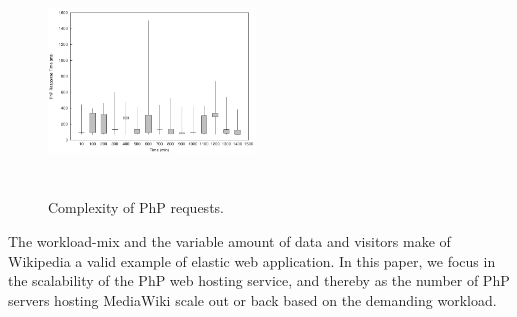 


\begin{figure}
\begin{center}
\includegraphics[width=0.49\textwidth, height=6cm]{./images/phpRespTimeDispersion}
\end{center}
\caption{Complexity of PhP requests.}
\label{phpRespTimeDispersion}
\end{figure}








The workload-mix and the variable amount of data and visitors make of Wikipedia a valid example of elastic web application. In this paper, we focus in the scalability of the PhP web hosting service, and thereby as the number of PhP servers hosting MediaWiki scale out or back based on the demanding workload.

